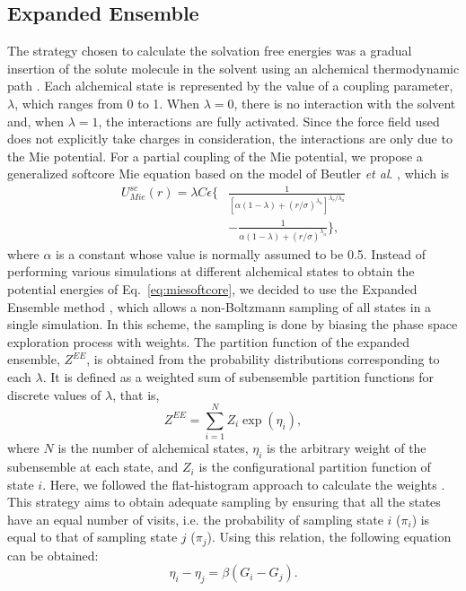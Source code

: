 \documentclass[final,12p,times,twocolumn]{elsarticle}
\begin{document}
	\subsection{Expanded Ensemble}
	\label{sec:expanded ensemble}

	The strategy chosen to calculate the solvation free energies was a gradual insertion of the solute molecule in the solvent using an alchemical thermodynamic path \cite{klimovich}. Each alchemical state is represented by the value of a coupling parameter, $\lambda$, which ranges from 0 to 1. When $\lambda=0$, there is no interaction with the solvent and, when $\lambda=1$, the interactions are fully activated. Since the force field used does not explicitly take charges in consideration, the interactions are only due to the Mie potential. For a partial coupling of the Mie potential, we propose a generalized softcore Mie equation based on the model of Beutler \textit{et al}. \cite{beutler}, which is
	\begin{equation}
	\label{eq:miesoftcore}
	\begin{aligned}
	U_{Mie}^{sc}(r) = \lambda C \epsilon \Bigg\lbrace & \frac{1}{\left[\alpha(1-\lambda)+ (r/\sigma)^{\lambda_a}\right]^{\lambda_{r}/\lambda_{a}}} \\ &-\frac{1}{\alpha(1-\lambda)+(r/\sigma)^{\lambda_a}} \Bigg\rbrace,
	\end{aligned}
	\end{equation}
	where $\alpha$ is a constant whose value is normally assumed to be 0.5. Instead of performing various simulations at different alchemical states to obtain the potential energies of Eq.~\eqref{eq:miesoftcore}, we decided to use the Expanded Ensemble method \cite{lyubartsev}, which allows a non-Boltzmann sampling of all states in a single simulation. In this scheme, the sampling is done by biasing the phase space exploration process with weights. The partition function of the expanded ensemble, $Z^{EE}$, is obtained from the probability distributions corresponding to each $\lambda$. It is defined as a weighted sum of subensemble partition functions for discrete values of $\lambda$, that is,
	\begin{equation}
	Z^{EE} = \sum_{i=1}^{N} Z_{i} \exp(\eta_{i}),
	\label{ee}
	\end{equation}
	where $N$ is the number of alchemical states, $\eta_i$ is the arbitrary weight of the subensemble at each state, and $Z_{i}$ is the configurational partition function of state $i$. Here, we followed the flat-histogram approach  to calculate the weights \cite{lyubartsev}. This strategy aims to obtain adequate sampling by ensuring that all the states have an equal number of visits, i.e. the probability of sampling state $i$ ($\pi_{i}$) is equal to that of sampling state $j$ ($\pi_{j}$). Using this relation, the following equation can be obtained:
	\begin{equation}
	\label{eqn:weight}
	\eta_{i} - \eta_{j} = \beta (G_i-G_j).
	\end{equation}
	
\end{document}
